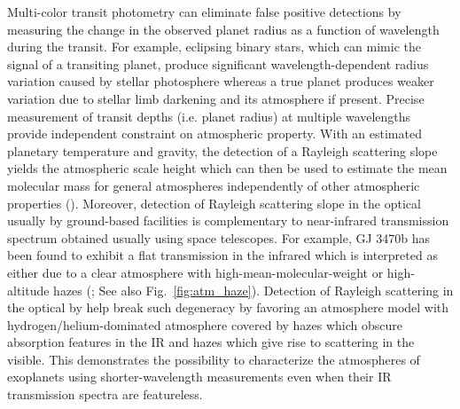 Multi-color transit photometry can eliminate false positive detections by measuring the change in the observed planet radius as a function of wavelength during the transit. For example, eclipsing binary stars, which can mimic the signal of a transiting planet, produce significant wavelength-dependent radius variation caused by stellar photosphere whereas a true planet produces weaker variation due to stellar limb darkening and its atmosphere if present. 
Precise measurement of transit depths (i.e. planet radius) at multiple wavelengths %
provide independent constraint on atmospheric property. With an estimated planetary temperature and gravity, the detection of a Rayleigh scattering slope yields the atmospheric scale height which can then be used to estimate the mean molecular mass for general atmospheres independently of other atmospheric properties (\cite{Benneke2012}). 
Moreover, detection of Rayleigh scattering slope in the optical usually by ground-based facilities is complementary to near-infrared transmission spectrum obtained usually using space telescopes. For example, GJ 3470b has been found to exhibit a flat transmission in the infrared which is interpreted as either due to a clear atmosphere with high-mean-molecular-weight or high-altitude  hazes (\cite{Kriedberg2014}; See also Fig.~\ref{fig:atm_haze}). Detection of Rayleigh scattering in the optical by \cite{Dragomir2015} help break such degeneracy by favoring an atmosphere model with hydrogen/helium-dominated atmosphere covered by hazes which obscure absorption features in the IR and hazes which give rise to scattering in the visible. This demonstrates the possibility to characterize the atmospheres of exoplanets using shorter-wavelength measurements even when their IR transmission spectra are featureless.


